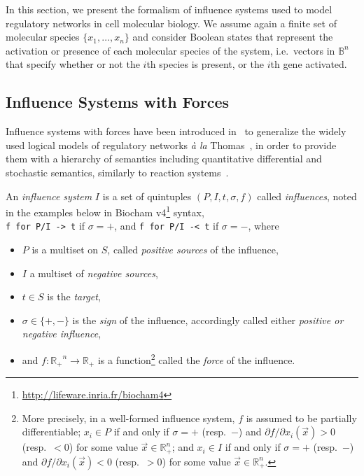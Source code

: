 \documentclass{llncs}
\begin{document}
In this section, we present the formalism of influence systems used to model regulatory networks in cell molecular biology.
We assume again a finite set of molecular species $\{x_1,\dots,x_n\}$ 
and consider Boolean states that represent the activation or presence of each molecular species of the system, 
i.e.~vectors in $\mathbb{B}^n$ that specify whether or not the $i$th species is present, or the $i$th gene activated.

\subsection{Influence Systems with Forces}


Influence systems with forces have been introduced in~\cite{FMRS16cmsb}
to generalize the widely used logical models of regulatory networks \emph{\`a la} Thomas~\cite{Thomas73jtb},
in order to provide them with a hierarchy of semantics
including quantitative differential and stochastic semantics, similarly to reaction systems~\cite{FS08tcs}.

\begin{definition}
An \emph{influence system}
   $I$ is a set of quintuples $(P, I, t, \sigma, f)$ called \emph{influences}, noted in the examples below in Biocham v4\footnote{\url{http://lifeware.inria.fr/biocham4}} syntax,\\ \verb|f for P/I -> t| if $\sigma=+$, and \verb|f for P/I -< t| if $\sigma=-$,
   where 
\begin{itemize}
\item $P$ is a multiset on $S$, called \emph{positive sources} of the influence, 
\item $I$ a multiset of \emph{negative sources}, 
\item $t\in S$ is the \emph{target},
\item $\sigma\in\{+,-\}$ is the \emph{sign} of the influence, accordingly called either \emph{positive or negative influence},
\item and $f:\mathbb{R_+}^n\to\mathbb{R_+}$ is a function\footnote{More precisely, in a well-formed influence system, $f$ is assumed to be partially differentiable;
$x_i\in P$ if and only if $\sigma = +$ (resp.\ $-$) and
   ${\partial {f}}/ {\partial x_i}(\vec x)>0$ (resp.\ $<0$) for some value
   $\vec x\in\mathbb{R}_+^n$;
 and $x_i\in I$ if and only if $\sigma = +$ (resp.\ $-$) and
   ${\partial {f}}/ {\partial x_i}(\vec x)<0$ (resp.\ $>0$) for some value
  $\vec x\in\mathbb{R}_+^n$.}
called the \emph{force} of the influence.
\end{itemize}
\end{definition}
\end{document}
